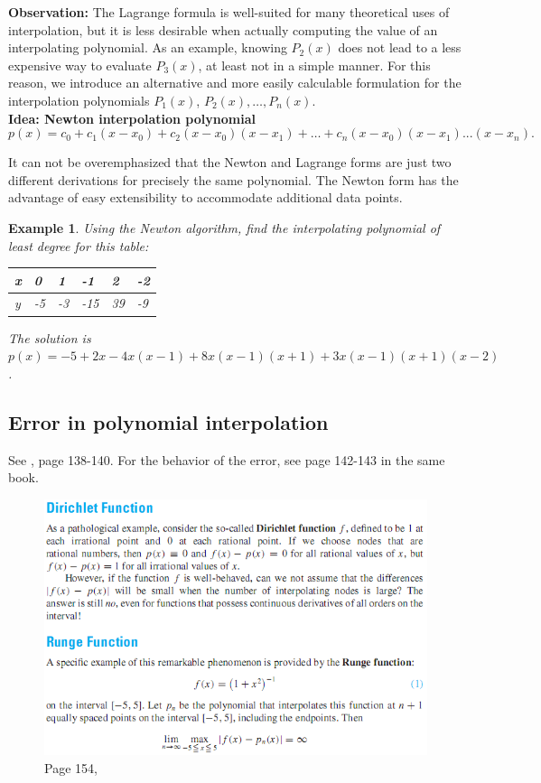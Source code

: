 \documentclass[12pt]{article}
\theoremstyle{theorem}
\newtheorem{exa}{Example}
\begin{document}
\textbf{Observation:} The Lagrange formula is well-suited for many theoretical uses of interpolation, but it is less desirable when actually computing the value of an interpolating polynomial. As an example, knowing $P_2(x)$ does not lead to a less expensive way to evaluate $P_3(x)$, 
at least not in a simple manner. For this reason, we introduce an alternative and more easily calculable formulation for the interpolation polynomials $P_1(x)$, $P_2(x), \dots, P_n(x)$. \\
%
\textbf{Idea: Newton interpolation polynomial}
%
\begin{equation*}
 p(x) = c_0 + c_1 (x-x_0) + c_2 (x-x_0) (x-x_1) + \dots + c_{n} (x-x_0)(x-x_1)...(x-x_n).
\end{equation*}
%
\begin{shaded}
It can not be overemphasized that the Newton and Lagrange forms are just two different derivations for precisely the same polynomial.
The Newton form has the advantage of easy extensibility to accommodate additional data points. 
\end{shaded}

\begin{exa} Using the Newton algorithm, find the interpolating polynomial of least degree for this table:
\begin{center}
\begin{tabular}[6]{l|l|l|l|l|l}
x & 0 & 1 & -1 & 2 & -2 \\ \hline 
y & -5 & -3 & -15 & 39 & -9
\end{tabular}
\end{center}
The solution is $p(x)= -5 + 2x - 4x(x-1)+ 8x(x-1)(x+1) + 3x(x-1)(x+1)(x-2)$. 
\end{exa}

\subsection{Error in polynomial interpolation}

See \cite{AtkH03}, page 138-140. For the behavior of the error, see page 142-143 in the same book.

\begin{figure}[h!]
	\centering
	\includegraphics[scale = 0.9]{Figures/15}
	\caption{Page 154, \cite{CheK07}}
\end{figure}
\end{document}
